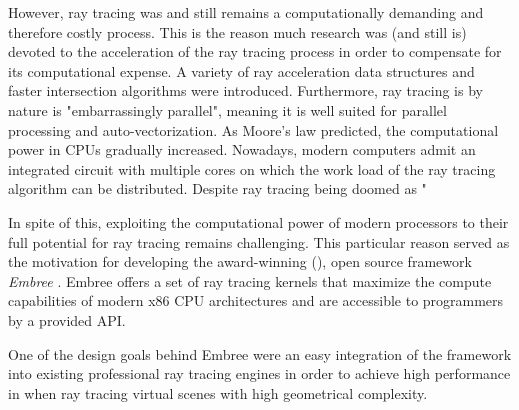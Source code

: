 However, ray tracing was and still remains a computationally demanding and therefore costly process. This is the reason much research was (and still is) devoted to the acceleration of the ray tracing process in order to compensate for its computational expense. A variety of ray acceleration data structures and faster intersection algorithms were introduced.
Furthermore, ray tracing is by nature is "embarrassingly parallel", meaning it is well suited for parallel processing and auto-vectorization.
As Moore's law predicted, the computational power in CPUs gradually increased. Nowadays, modern computers admit an integrated circuit with multiple cores on which the work load of the ray tracing algorithm can be distributed. Despite ray tracing being doomed as "

In spite of this, exploiting the computational power of modern processors to their full potential for ray tracing remains challenging.  
This particular reason served as the motivation for developing the award-winning (\cite{embreeAward}), open source framework \emph{Embree} \cite{wald2014embree}. Embree offers a set of ray tracing kernels that maximize the compute capabilities of modern x86 CPU architectures and are accessible to programmers by a provided API. 

One of the design goals behind Embree were an easy integration of the framework into existing professional ray tracing engines in order to achieve high performance in when ray tracing virtual scenes with high geometrical complexity.

